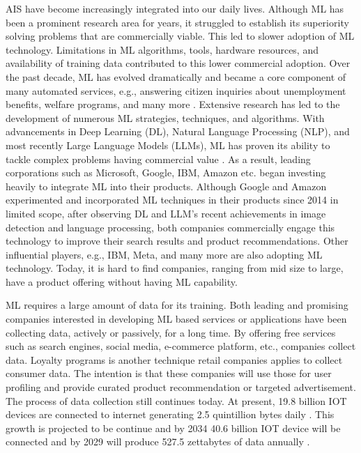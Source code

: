 \documentclass[manuscript,screen,review]{acmart}
\begin{document}
	AIS have become increasingly integrated into our daily lives. Although ML has been a prominent research area for years, it struggled to establish its superiority solving problems that are commercially viable. This led to slower adoption of ML technology. Limitations in ML algorithms, tools, hardware resources, and availability of training data contributed to this lower commercial adoption. Over the past decade, ML has evolved dramatically and became a core component of many automated services, e.g., answering citizen inquiries about unemployment benefits, welfare programs, and many more \cite{10.1093/ppmgov/gvaf013}. Extensive research has led to the development of numerous ML strategies, techniques, and algorithms. With advancements in Deep Learning (DL), Natural Language Processing (NLP), and most recently Large Language Models (LLMs), ML has proven its ability to tackle complex problems having commercial value \cite{li_impact_2023} \cite{pugliese_machine_2021}. As a result, leading corporations such as Microsoft, Google, IBM, Amazon etc. began investing heavily to integrate ML into their products. Although Google and Amazon experimented and incorporated ML techniques in their products since 2014 in limited scope, after observing DL and LLM's recent achievements in image detection and language processing, both companies commercially engage this technology to improve their search results and product recommendations. Other influential players, e.g., IBM, Meta, and many more are also adopting ML technology. Today, it is hard to find companies, ranging from mid size to large, have a product offering without having ML capability.
	
	ML requires a large amount of data for its training. Both leading and promising companies interested in developing ML based services or applications have been collecting data, actively or passively, for a long time. By offering free services such as search engines, social media, e-commerce platform, etc., companies collect data. Loyalty programs is another technique retail companies applies to collect consumer data. The intention is that these companies will use those for user profiling and provide curated product recommendation or targeted advertisement. The process of data collection still continues today. At present, 19.8 billion IOT devices are \cite{statistica_2} connected to internet generating 2.5 quintillion bytes daily \cite{seedscientific}. This growth is projected to be continue and by 2034 40.6 billion IOT device will be connected and by 2029 will produce 527.5 zettabytes  of data annually \cite{statistica_1} \cite{statistica_2}.
	
\end{document}
